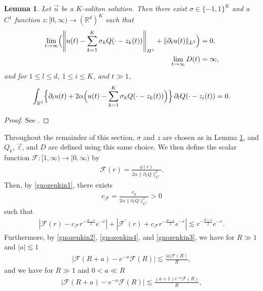 \documentclass[reqno]{amsart}
\theoremstyle{plain}
\newtheorem{lemma}[theorem]{Lemma}
\theoremstyle{definition}
\numberwithin{equation}{section}
\begin{document}
\begin{lemma}\label{modKsoli}
Let $\vec{u}$ be a $K$-soliton solution. Then there exist $\sigma\in\{-1,1\}^K$ and a $C^1$ function
$z:[0,\infty)\to (\mathbb{R}^d)^K$ such that
\begin{align}
\lim_{t\to\infty}\Bigl(\left\| u(t)-\sum_{k=1}^K \sigma_kQ(\cdot-z_k(t))\right\|_{H^1}
+\|{\partial}_tu(t)\|_{L^2}\Bigr)&=0,\label{modlim1yowa}
\\
\lim_{t\to\infty} D(t)&=\infty, \label{modlim2yowa}
\end{align}
and for $1\leq l\leq d$, $1\leq i\leq K$, and $t\gg 1$,
\begin{align}\label{modeqyowa}
\int_{\mathbb{R}^d} \Bigl\{ {\partial}_tu(t)+2\alpha\Bigl(u(t)-\sum_{k=1}^K \sigma_k Q(\cdot-z_k(t))\Bigr)\Bigr\}
\, {\partial}_lQ(\cdot-z_i(t))=0.
\end{align}
\end{lemma}
\begin{proof}
See \cite[Lemma 3.2]{I2}.
\end{proof}
Throughout the remainder of this section, $\sigma$ and $z$ are chosen as in Lemma \ref{modKsoli}, and $Q_k$, $\vec{\varepsilon}$, and $D$ are defined using this same choice. We then define the scalar function $\mathcal{F}:[1,\infty)\to [0,\infty)$ by
\begin{align}\label{Fdef}
\mathcal{F}(r)=\frac{g(r)}{2\alpha\|{\partial}_1Q\|_{L^2}^2}.
\end{align}
Then, by \eqref{gnozenkin1}, there exists
\begin{align*}
c_{\mathcal{F}}=\frac{c_g}{2\alpha\|{\partial}_1Q\|_{L^2}^2}>0
\end{align*}
such that 
\begin{align}\label{mathcalFhyouka1}
\left|\mathcal{F}(r)-c_{\mathcal{F}}r^{-\frac{d-1}{2}}e^{-r}\right|+\left|\mathcal{F}^{\prime}(r)+c_{\mathcal{F}}r^{-\frac{d-1}{2}}e^{-r}\right|
\lesssim r^{-\frac{d+1}{2}}e^{-r}.
\end{align}
Furthermore, by \eqref{gnozenkin2}, \eqref{gnozenkin4}, and \eqref{gnozenkin3}, we have for $R\gg 1$ and $|a|\lesssim 1$
\begin{align}\label{tukaeruF1}
\left|\mathcal{F}(R+a)-e^{-a}\mathcal{F}(R)\right|\lesssim \frac{|a|\mathcal{F}(R)}{R},
\end{align}
and we have for $R\gg 1$ and $0<a\ll R$
\begin{align}\label{tukaeruF3}
\left|\mathcal{F}(R+a)-e^{-a}\mathcal{F}(R)\right|\lesssim \frac{(a+1)e^{-a}\mathcal{F}(R)}{R},
\end{align}
\end{document}
